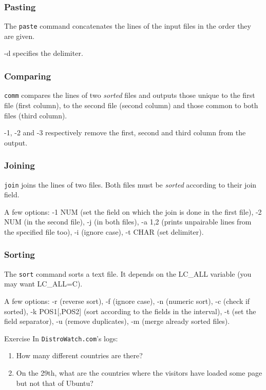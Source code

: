 \documentclass{beamer}
\begin{document}
\begin{frame}
  \frametitle{Pasting}
  The \texttt{paste} command concatenates the lines of the input files
  in the order they are given.

  \vfill

  -d specifies the delimiter.
\end{frame}

\begin{frame}
  \frametitle{Comparing}
  \texttt{comm} compares the lines of two \emph{sorted} files and
  outputs those unique to the first file (first column), to the second
  file (second column) and those common to both files (third column).

  \vfill

  -1, -2 and -3 respectively remove the first, second and third column
  from the output.
\end{frame}

\begin{frame}
  \frametitle{Joining}
  \texttt{join} joins the lines of two files. Both files must be
  \emph{sorted} according to their join field.

  \vfill

  A few options: -1 NUM (set the field on which the join is done in
  the first file), -2 NUM (in the second file), -j (in both files), -a
  {1,2} (prints unpairable lines from the specified file too), -i
  (ignore case), -t CHAR (set delimiter).
\end{frame}

\begin{frame}
  \frametitle{Sorting}
  The \texttt{sort} command sorts a text file. It depends on the
  LC\_ALL variable (you may want LC\_ALL=C).

  \vfill

  A few options: -r (reverse sort), -f (ignore case), -n (numeric
  sort), -c (check if sorted), -k POS1[,POS2] (sort according to the
  fields in the interval), -t (set the field separator), -u (remove
  duplicates), -m (merge already sorted files).

  \vfill
  \pause

  \begin{exampleblock}{Exercise}
    In \texttt{DistroWatch.com}'s logs:
    \begin{enumerate}
    \item How many different countries are there?
    \item On the 29th, what are the countries where the visitors have
      loaded some page but not that of Ubuntu?
    \end{enumerate}
  \end{exampleblock}
\end{frame}
\end{document}
